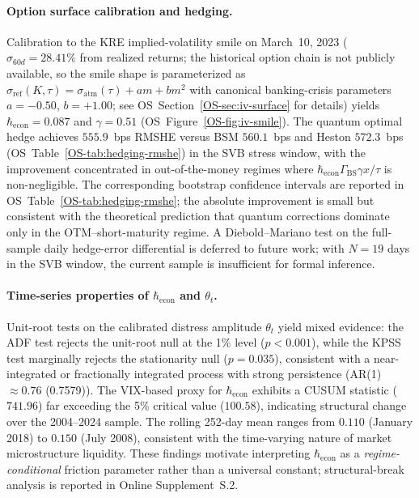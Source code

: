 \paragraph{Option surface calibration and hedging.}
Calibration to the KRE implied-volatility smile on March~10, 2023
($\hat\sigma_{60d} = 28.41\%$ from realized returns; the historical option chain
is not publicly available, so the smile shape is parameterized as
$\sigma_{\mathrm{ref}}(K,\tau)=\sigma_{\mathrm{atm}}(\tau)+am+bm^2$ with
canonical banking-crisis parameters $a=-0.50$, $b=+1.00$; see
OS~Section~\ref{OS-sec:iv-surface} for details)
yields $\hbar_{\mathrm{econ}} = 0.087$ and $\gamma = 0.51$ (OS~Figure~\ref{OS-fig:iv-smile}).
The quantum optimal hedge achieves $555.9$~bps RMSHE versus BSM $560.1$~bps
and Heston $572.3$~bps (OS~Table~\ref{OS-tab:hedging-rmshe})
in the SVB stress window, with
the improvement concentrated in out-of-the-money regimes where
$\hbar_{\mathrm{econ}}\Gamma_{\mathrm{BS}}\gamma x/\tau$ is non-negligible.
The corresponding bootstrap confidence intervals are
reported in OS~Table~\ref{OS-tab:hedging-rmshe}; the absolute improvement is small but consistent
with the theoretical prediction that quantum corrections dominate only in
the OTM--short-maturity regime. A Diebold--Mariano test on the full-sample
daily hedge-error differential is deferred to future work; with $N=19$ days
in the SVB window, the current sample is insufficient for formal inference.

\paragraph{Time-series properties of $\hbar_{\mathrm{econ}}$ and $\theta_t$.}
Unit-root tests on the calibrated distress amplitude $\theta_t$ yield mixed
evidence: the ADF test rejects the unit-root null at the 1\% level
($p < 0.001$), while the KPSS test marginally rejects the stationarity null
($p = 0.035$), consistent with a near-integrated or fractionally integrated
process with strong persistence (AR(1) $\approx 0.76$ (0.7579)). The VIX-based proxy for
$\hbar_{\mathrm{econ}}$ exhibits a CUSUM statistic ($741.96$) far exceeding
the 5\% critical value ($100.58$), indicating structural change over the
2004--2024 sample. The rolling 252-day mean ranges from $0.110$ (January 2018)
to $0.150$ (July 2008), consistent with the time-varying nature of market
microstructure liquidity. These findings motivate interpreting $\hbar_{\mathrm{econ}}$
as a \emph{regime-conditional} friction parameter rather than a universal constant;
structural-break analysis is reported in Online Supplement~S.2.

